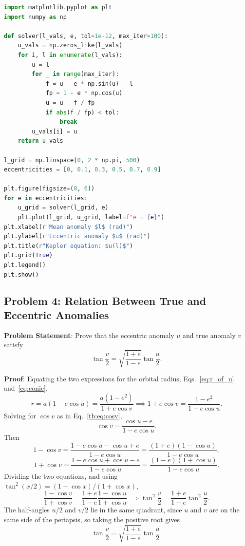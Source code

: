 \begin{lstlisting}[language=Python]
import matplotlib.pyplot as plt
import numpy as np

def solver(l_vals, e, tol=1e-12, max_iter=100):
    u_vals = np.zeros_like(l_vals)
    for i, l in enumerate(l_vals):
        u = l
        for _ in range(max_iter):
            f = u - e * np.sin(u) - l
            fp = 1 - e * np.cos(u)
            u = u - f / fp
            if abs(f / fp) < tol:
                break
        u_vals[i] = u
    return u_vals

l_grid = np.linspace(0, 2 * np.pi, 500)
eccentricities = [0, 0.1, 0.3, 0.5, 0.7, 0.9]

plt.figure(figsize=(8, 6))
for e in eccentricities:
    u_grid = solver(l_grid, e)
    plt.plot(l_grid, u_grid, label=f"e = {e}")
plt.xlabel(r"Mean anomaly $l$ (rad)")
plt.ylabel(r"Eccentric anomaly $u$ (rad)")
plt.title(r"Kepler equation: $u(l)$")
plt.grid(True)
plt.legend()
plt.show()
\end{lstlisting}

\subsection{Problem 4: Relation Between True and Eccentric Anomalies}
\label{tb:prob:anomalies}

\textbf{Problem Statement}: Prove that the eccentric anomaly $u$ and true anomaly $v$ satisfy
\begin{equation}
	\tan\frac{v}{2} = \sqrt{\frac{1+e}{1-e}}\tan\frac{u}{2}.
\end{equation}

\textbf{Proof}:
Equating the two expressions for the orbital radius, Eqs.~\eqref{eq:r_of_u} and~\eqref{eq:conic},
\[
r = a(1-e\cos u) = \frac{a(1-e^2)}{1+e\cos v} \implies 1+e\cos v = \frac{1-e^2}{1-e\cos u}.
\]
Solving for $\cos v$ as in Eq.~\eqref{tb:eq:cosv},
\[
\cos v = \frac{\cos u - e}{1 - e\cos u}.
\]
Then
\[
1 - \cos v = \frac{1-e\cos u-\cos u+e}{1-e\cos u}=\frac{(1+e)(1-\cos u)}{1-e\cos u},
\]
\[
1 + \cos v = \frac{1-e\cos u+\cos u-e}{1-e\cos u}=\frac{(1-e)(1+\cos u)}{1-e\cos u}.
\]
Dividing the two equations, and using $\tan^2(x/2)=(1-\cos x)/(1+\cos x)$,
\[
\frac{1-\cos v}{1+\cos v} = \frac{1+e}{1-e}\frac{1-\cos u}{1+\cos u} \implies \tan^2\frac{v}{2} = \frac{1+e}{1-e}\tan^2\frac{u}{2}.
\]
The half-angles $u/2$ and $v/2$ lie in the same quadrant, since $u$ and $v$ are on the same side of the periapsis, so taking the positive root gives
\begin{equation}
	\boxed{\tan\frac{v}{2} = \sqrt{\frac{1+e}{1-e}}\tan\frac{u}{2}}.
\end{equation}

